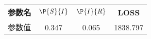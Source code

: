 \begin{tabular}{cccc}
\hline
参数名&$\P{S}{I}$&$\P{I}{R}$&LOSS\\
\hline
参数值&0.347&0.065&1838.797\\
\hline
\end{tabular}